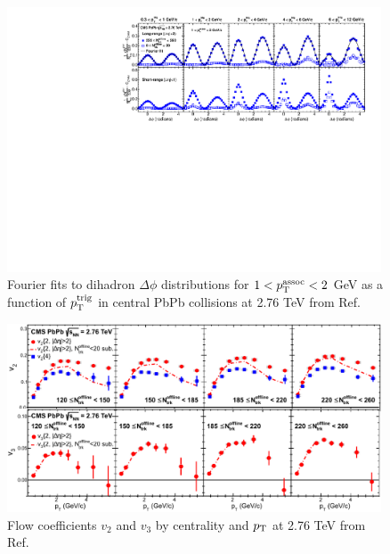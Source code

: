 \begin{figure}[hbtp]
\begin{center}
\includegraphics[width=0.99\textwidth]{figures/Theory/CMS_2particle_corr_fits.pdf}
\caption[Fits to dihadron $\Delta\phi$ distributions to extract flow coefficients]{Fourier fits to dihadron $\Delta\phi$ distributions for  $1< p_{\rm T}^{\rm assoc} < 2$ GeV as a function of $p_{\rm T}^{\rm trig}$ in central PbPb collisions at 2.76 TeV from Ref.~\cite{Chatrchyan:2013nka}}
\label{fig:cms_dihadron_fits}
\end{center}
\end{figure}

\begin{figure}[hbtp]
\begin{center}
\includegraphics[width=0.99\textwidth]{figures/Theory/CMS_v2_v3_result.pdf}
\caption[Flow coefficients $v_{2}$ and $v_{3}$ by centrality and $p_{\rm T}$]{Flow coefficients $v_{2}$ and $v_{3}$ by centrality and $p_{\rm T}$ at 2.76 TeV from Ref.~\cite{Chatrchyan:2013nka}}
\label{fig:cms_v2_v3_result}
\end{center}
\end{figure}


